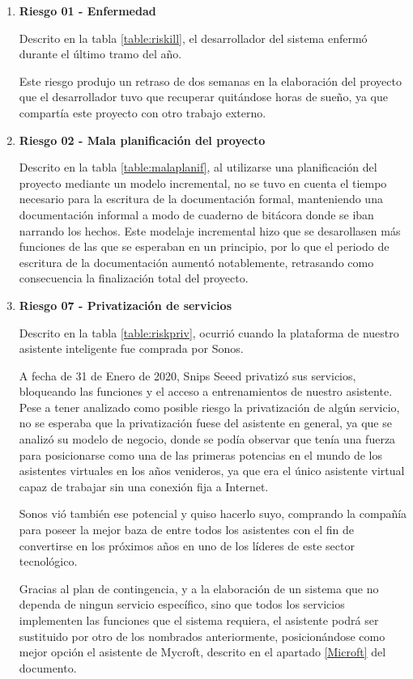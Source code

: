         \begin{enumerate}
        
        \item \textbf{Riesgo 01 - Enfermedad}
        
        Descrito en la tabla \ref{table:riskill}, el desarrollador del sistema enfermó durante el último tramo del año.
        
        Este riesgo produjo un retraso de dos semanas en la elaboración del proyecto que el desarrollador tuvo que recuperar quitándose horas de sueño, ya que compartía este proyecto con otro trabajo externo.
        
        \item \textbf{Riesgo 02 - Mala planificación del proyecto}
        
        Descrito en la tabla \ref{table:malaplanif}, al utilizarse una planificación del proyecto mediante un modelo incremental, no se tuvo en cuenta el tiempo necesario para la escritura de la documentación formal, manteniendo una documentación informal a modo de cuaderno de bitácora donde se iban narrando los hechos.
        Este modelaje incremental hizo que se desarollasen más funciones de las que se esperaban en un principio, por lo que el periodo de escritura de la documentación aumentó notablemente, retrasando como consecuencia la finalización total del proyecto.
        
            \item \textbf{Riesgo 07 - Privatización de servicios}
            
        Descrito en la tabla \ref{table:riskpriv}, ocurrió cuando la plataforma de nuestro asistente inteligente fue comprada por Sonos. 
        
        A fecha de 31 de Enero de 2020, Snips Seeed privatizó sus servicios, bloqueando las funciones y el acceso a entrenamientos de nuestro asistente. Pese a tener analizado como posible riesgo la privatización de algún servicio, no se esperaba que la privatización fuese del asistente en general, ya que se analizó su modelo de negocio, donde se podía observar que tenía una fuerza para posicionarse como una de las primeras potencias en el mundo de los asistentes virtuales en los años venideros, ya que era el único asistente virtual capaz de trabajar sin una conexión fija a Internet. 
        
        Sonos vió también ese potencial y quiso hacerlo suyo, comprando la compañía para poseer la mejor baza de entre todos los asistentes con el fin de convertirse en los próximos años en uno de los líderes de este sector tecnológico.
        
        Gracias al plan de contingencia, y a la elaboración de un sistema que no dependa de ningun servicio específico, sino que todos los servicios implementen las funciones que el sistema requiera, el asistente podrá ser sustituido por otro de los nombrados anteriormente, posicionándose como mejor opción el asistente de Mycroft, descrito en el apartado \ref{Microft} del documento.
        
        
        \end{enumerate}